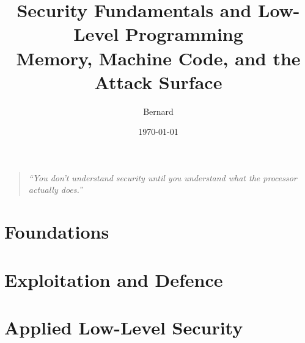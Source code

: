 \documentclass[11pt,a4paper]{book}
\theoremstyle{definition}
\theoremstyle{plain}
\begin{document}
\title{\Huge\textbf{Security Fundamentals and Low-Level Programming}\\[0.5cm]
	\large Memory, Machine Code, and the Attack Surface}
\author{Bernard}
\date{\today}
\maketitle
\thispagestyle{empty}

\vfill
\begin{quote}
	\emph{``You don't understand security until you understand what the processor actually does.''}
\end{quote}
\vfill

\newpage
\tableofcontents
\newpage

\part{Foundations}





\part{Exploitation and Defence}




\part{Applied Low-Level Security}




\newpage


\end{document}
